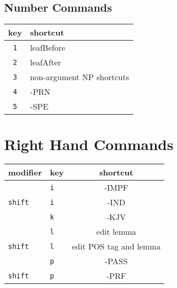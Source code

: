 \documentclass[10pt]{article}
\begin{document}
\begin{multicols}{2}
\subsection{Number Commands}
\label{sec:left-number-commands}

\begin{tabular}{c l}
\hline
key & shortcut\\
\hline
\hline
\texttt{1} & leafBefore\\
\hline
\texttt{2} & leafAfter\\
\hline
\texttt{3} & non-argument NP shortcuts\\
\hline
\texttt{4} & -PRN\\
\hline
\texttt{5} & -SPE\\
\hline
\end{tabular}

\section{Right Hand Commands}
\label{sec:right-commands}

\begin{tabular}{l l c}
\hline
modifier & key & shortcut\\
\hline
\hline
& \texttt{i} & -IMPF\\
\texttt{shift} & \texttt{i} & -IND\\
\hline
& \texttt{k} & -KJV\\
\hline
& \texttt{l} & edit lemma\\
\texttt{shift} & \texttt{l} & edit POS tag and lemma\\
\hline
& \texttt{p} & -PASS\\
\texttt{shift} & \texttt{p} & -PRF\\
\hline
\end{tabular}

\end{multicols}
\end{document}
